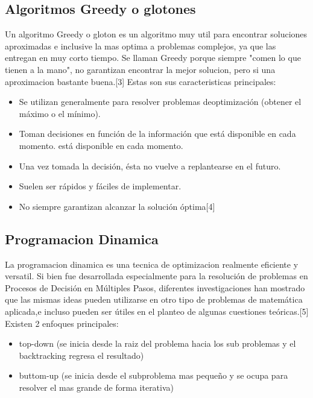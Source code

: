 \documentclass[spanish]{article}
\begin{document}
	\subsection{Algoritmos Greedy o glotones}	
		Un algoritmo Greedy o gloton es un algoritmo muy util para encontrar soluciones aproximadas e inclusive la mas optima a problemas complejos, ya que las entregan en muy corto tiempo. Se llaman Greedy porque siempre "comen lo que tienen a la mano", no garantizan encontrar la mejor solucion, pero si una aproximacion bastante buena.[3]
		Estas son sus caracteristicas principales:
		\begin{itemize}
			\item Se utilizan generalmente para resolver problemas deoptimización (obtener el máximo o el mínimo).
			\item Toman decisiones en función de la información que está disponible en cada momento. está disponible en cada momento.
			\item Una vez tomada la decisión, ésta no vuelve a replantearse en el futuro.
			\item Suelen ser rápidos y fáciles de implementar.
			\item No siempre garantizan alcanzar la solución óptima[4]
		\end{itemize}
	\subsection{Programacion Dinamica}
		La programacion dinamica es una tecnica de optimizacion realmente eficiente y versatil. Si bien fue desarrollada especialmente para la resolución de problemas en Procesos de Decisión en Múltiples Pasos, diferentes investigaciones han mostrado que las mismas ideas pueden utilizarse en otro tipo de problemas de matemática aplicada,e incluso pueden ser útiles en el planteo de algunas cuestiones teóricas.[5]
		Existen 2 enfoques principales:
		\begin{itemize}
			\item top-down (se inicia desde la raiz del problema hacia los sub problemas y el backtracking regresa el resultado)
			\item buttom-up (se inicia desde el subproblema mas pequeño y se ocupa para resolver el mas grande de forma iterativa)
		\end{itemize}
\end{document}
